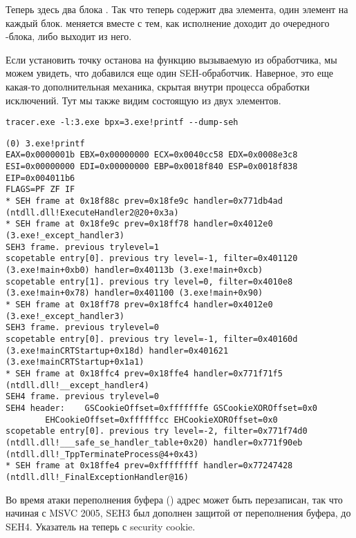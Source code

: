 

Теперь здесь два блока .
Так что  теперь содержит два элемента, один элемент на каждый блок.
 меняется вместе с тем, как исполнение доходит до очередного -блока, либо выходит из него.



Если установить точку останова на функцию \printf{} вызываемую из обработчика,
мы можем увидеть, что добавился еще один SEH-обработчик.
Наверное, это еще какая-то дополнительная механика, скрытая внутри процесса обработки исключений.
Тут мы также видим  состоящую из двух элементов.

\begin{lstlisting}
tracer.exe -l:3.exe bpx=3.exe!printf --dump-seh
\end{lstlisting}

\begin{lstlisting}[caption=tracer.exe output]
(0) 3.exe!printf
EAX=0x0000001b EBX=0x00000000 ECX=0x0040cc58 EDX=0x0008e3c8
ESI=0x00000000 EDI=0x00000000 EBP=0x0018f840 ESP=0x0018f838
EIP=0x004011b6
FLAGS=PF ZF IF
* SEH frame at 0x18f88c prev=0x18fe9c handler=0x771db4ad (ntdll.dll!ExecuteHandler2@20+0x3a)
* SEH frame at 0x18fe9c prev=0x18ff78 handler=0x4012e0 (3.exe!_except_handler3)
SEH3 frame. previous trylevel=1
scopetable entry[0]. previous try level=-1, filter=0x401120 (3.exe!main+0xb0) handler=0x40113b (3.exe!main+0xcb)
scopetable entry[1]. previous try level=0, filter=0x4010e8 (3.exe!main+0x78) handler=0x401100 (3.exe!main+0x90)
* SEH frame at 0x18ff78 prev=0x18ffc4 handler=0x4012e0 (3.exe!_except_handler3)
SEH3 frame. previous trylevel=0
scopetable entry[0]. previous try level=-1, filter=0x40160d (3.exe!mainCRTStartup+0x18d) handler=0x401621 (3.exe!mainCRTStartup+0x1a1)
* SEH frame at 0x18ffc4 prev=0x18ffe4 handler=0x771f71f5 (ntdll.dll!__except_handler4)
SEH4 frame. previous trylevel=0
SEH4 header:	GSCookieOffset=0xfffffffe GSCookieXOROffset=0x0
		EHCookieOffset=0xffffffcc EHCookieXOROffset=0x0
scopetable entry[0]. previous try level=-2, filter=0x771f74d0 (ntdll.dll!___safe_se_handler_table+0x20) handler=0x771f90eb (ntdll.dll!_TppTerminateProcess@4+0x43)
* SEH frame at 0x18ffe4 prev=0xffffffff handler=0x77247428 (ntdll.dll!_FinalExceptionHandler@16)
\end{lstlisting}


\myindex{\BufferOverflow}
Во время атаки переполнения буфера ()
адрес  может быть перезаписан, так что начиная с MSVC 2005, SEH3 был дополнен защитой от переполнения буфера, до SEH4.
Указатель на  теперь  с \gls{security cookie}.

